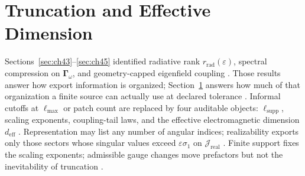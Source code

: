 \section{Truncation and Effective Dimension}
\label{sec:ch46}

Sections~\ref{sec:ch43}--\ref{sec:ch45} identified radiative rank \(r_{\mathrm{rad}}(\varepsilon)\), spectral compression on
\(\boldsymbol{\Gamma}_\omega\), and geometry-capped eigenfield coupling \cite{stratton1941,harrington2001,devaney2004}. Those results answer
how export information is organized; Section~\ref{sec:ch46} answers how much of that organization a finite source can actually use at
declared tolerance \cite{hansen1988,jackson1999}. Informal cutoffs at \(\ell_{\max}\) or patch count are replaced by four auditable objects:
\(\ell_{\mathrm{supp}}\), scaling exponents, coupling-tail laws, and the effective electromagnetic dimension \(d_{\mathrm{eff}}\)
\cite{stratton1941,harrington2001}. Representation may list any number of angular indices; realizability exports only those sectors whose
singular values exceed \(\varepsilon\sigma_{1}\) on \(\mathcal{J}_{\mathrm{real}}\) \cite{devaney2004,hansen1988}. Finite support fixes the
scaling exponents; admissible gauge changes move prefactors but not the inevitability of truncation \cite{jackson1999,stratton1941}.

